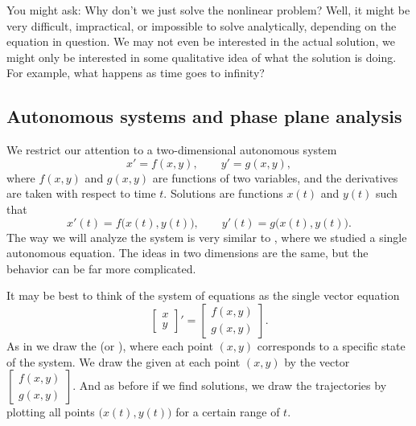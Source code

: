 \documentclass{ximera}
\begin{document}
You might ask: Why don't we just solve the nonlinear problem?  Well, it might be very difficult, impractical, or impossible to solve analytically, depending on the equation in question.  We may not even be interested in the actual solution, we might only be interested in some qualitative idea of what the solution is doing.  For example,
what happens as time goes to infinity?


\subsection{Autonomous systems and phase plane analysis}

We restrict our attention to a two-dimensional autonomous system
\begin{equation*}
    x' = f(x,y) , \qquad y' = g(x,y) ,
\end{equation*}
where $f(x,y)$ and $g(x,y)$ are functions of two variables, and the derivatives are taken with respect to time $t$.  Solutions are functions $x(t)$ and $y(t)$ such that
\begin{equation*}
    x'(t) = f\bigl(x(t),y(t)\bigr), \qquad y'(t) = g\bigl(x(t),y(t)\bigr) .
\end{equation*}
The way we will analyze the system is very similar to , where we studied a single autonomous equation.  The ideas in two dimensions are the same, but the behavior can be far more complicated.

It may be best to think of the system of equations as the single vector equation
\begin{equation} \label{eq:nlinautn2}
    \begin{bmatrix} 
        x \\ 
        y 
    \end{bmatrix} ' =
    \begin{bmatrix} 
        f(x,y) \\ 
        g(x,y) 
    \end{bmatrix} .
\end{equation}
As in  we draw the \emph{} (or \emph{}), where each point $(x,y)$ corresponds to a specific state of the system. We draw the \emph{} given at each point $(x,y)$ by the vector
$\left[ \begin{smallmatrix} f(x,y) \\ g(x,y) \end{smallmatrix} \right]$.
And as before if we find solutions, we draw the trajectories by plotting all points $\bigl(x(t),y(t)\bigr)$ for a certain range of $t$.
\end{document}
